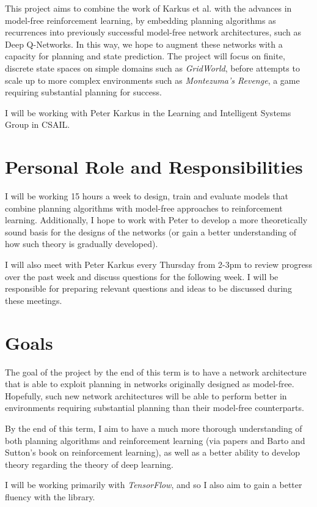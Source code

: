 \documentclass{article}[11pt]
\begin{document}
This project aims to combine the work of Karkus et al.
with the advances in model-free reinforcement learning, by
embedding planning algorithms as recurrences into
previously successful model-free network architectures, such as
Deep Q-Networks. In this way, we hope to augment
these networks with a capacity for planning
and state prediction. The project will focus on
finite, discrete state spaces on simple domains
such as {\it GridWorld}, before attempts to scale
up to more complex environments such as
{\it Montezuma's Revenge}, a game requiring
substantial planning for success.

I will be working with Peter Karkus in the Learning
and Intelligent Systems Group in CSAIL.

\section{Personal Role and Responsibilities}
I will be working 15 hours a week to design, train and evaluate
models that combine planning algorithms with model-free
approaches to reinforcement learning. Additionally, I hope to work
with Peter to develop a more theoretically sound basis
for the designs of the networks (or gain a better understanding
of how such theory is gradually developed).

I will also meet with Peter Karkus every Thursday from 2-3pm to
review progress over the past week and discuss questions
for the following week. I will be responsible for
preparing relevant questions and ideas to be discussed
during these meetings.

\section{Goals}
The goal of the project by the end of this term is to
have a network architecture that is able to exploit
planning in networks originally designed as model-free.
Hopefully, such new network architectures will be
able to perform better in environments requiring
substantial planning than their model-free counterparts.

By the end of this term, I aim to have a much more thorough
understanding of both planning algorithms and reinforcement
learning (via papers and Barto and Sutton's book on
reinforcement learning), as well as a better ability to
develop theory regarding the theory of deep learning.

I will be working primarily with {\it TensorFlow}, and
so I also aim to gain a better fluency with
the library.
\end{document}
